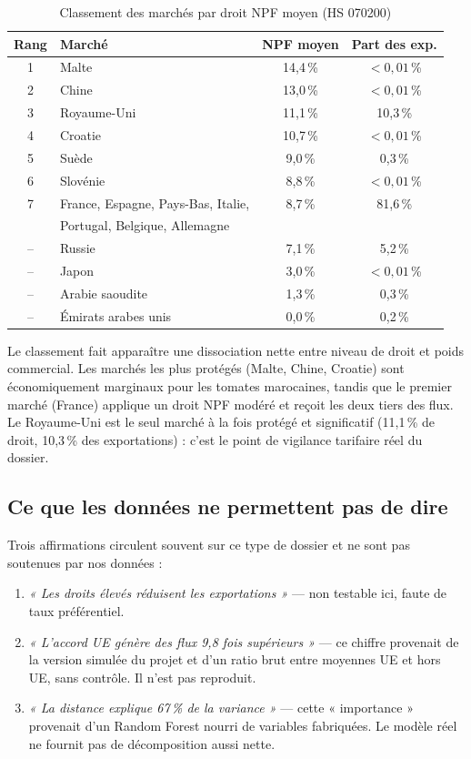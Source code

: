 \documentclass[11pt,a4paper]{article}
\begin{document}
\begin{table}[H]
\centering
\caption{Classement des marchés par droit NPF moyen (HS 070200)}\label{tab:classement}
\small
\setlength{\tabcolsep}{5pt}
\begin{tabular}{@{}clcc@{}}
\toprule
\textbf{Rang} & \textbf{Marché} & \textbf{NPF moyen} & \textbf{Part des exp.} \\
\midrule
1 & Malte & 14,4\,\% & $<0{,}01$\,\% \\
2 & Chine & 13,0\,\% & $<0{,}01$\,\% \\
3 & Royaume-Uni & 11,1\,\% & 10,3\,\% \\
4 & Croatie & 10,7\,\% & $<0{,}01$\,\% \\
5 & Suède & 9,0\,\% & 0,3\,\% \\
6 & Slovénie & 8,8\,\% & $<0{,}01$\,\% \\
7 & France, Espagne, Pays-Bas, Italie, & 8,7\,\% & 81,6\,\% \\
  & Portugal, Belgique, Allemagne & & \\
\midrule
-- & Russie & 7,1\,\% & 5,2\,\% \\
-- & Japon & 3,0\,\% & $<0{,}01$\,\% \\
-- & Arabie saoudite & 1,3\,\% & 0,3\,\% \\
-- & Émirats arabes unis & 0,0\,\% & 0,2\,\% \\
\bottomrule
\end{tabular}
\end{table}

Le classement fait apparaître une dissociation nette entre niveau de droit et poids
commercial. Les marchés les plus protégés (Malte, Chine, Croatie) sont
économiquement marginaux pour les tomates marocaines, tandis que le premier marché
(France) applique un droit NPF modéré et reçoit les deux tiers des flux. Le
Royaume-Uni est le seul marché à la fois protégé et significatif (11,1\,\% de droit,
10,3\,\% des exportations) : c'est le point de vigilance tarifaire réel du dossier.

\subsection{Ce que les données ne permettent pas de dire}

Trois affirmations circulent souvent sur ce type de dossier et ne sont pas soutenues
par nos données :

\begin{enumerate}[leftmargin=1.2cm]
    \item \emph{« Les droits élevés réduisent les exportations »} — non testable ici,
          faute de taux préférentiel.
    \item \emph{« L'accord UE génère des flux 9,8 fois supérieurs »} — ce chiffre
          provenait de la version simulée du projet et d'un ratio brut entre moyennes
          UE et hors UE, sans contrôle. Il n'est pas reproduit.
    \item \emph{« La distance explique 67\,\% de la variance »} — cette
          « importance » provenait d'un Random Forest nourri de variables fabriquées.
          Le modèle réel ne fournit pas de décomposition aussi nette.
\end{enumerate}
\end{document}
